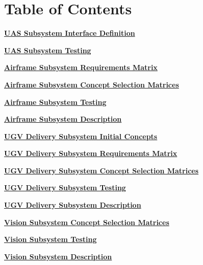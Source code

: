 \documentclass[]{article}
\newcounter{includepdfpage}
\newcommand{\pdflink}[2]{
\hyperlink{#1.1}{\textbf{#2}}
}
\newcommand{\pdflinkdoc}[2]{

}
\begin{document}



\section*{Table of Contents}

\pdflink{ss_def}{UAS Subsystem Interface Definition}

\pdflink{ss_test}{UAS Subsystem Testing}


\pdflink{af_reqmat}{Airframe Subsystem Requirements Matrix}

\pdflink{af_select}{Airframe Subsystem Concept Selection Matrices}

\pdflink{af_test}{Airframe Subsystem Testing}

\pdflink{af_def}{Airframe Subsystem Description}


\pdflink{ugv_init}{UGV Delivery Subsystem Initial Concepts}

\pdflink{ugv_reqmat}{UGV Delivery Subsystem Requirements Matrix}

\pdflink{ugv_select}{UGV Delivery Subsystem Concept Selection Matrices}

\pdflink{ugv_test}{UGV Delivery Subsystem Testing}

\pdflink{ugv_def}{UGV Delivery Subsystem Description}


\pdflink{vis_select}{Vision Subsystem Concept Selection Matrices}

\pdflink{vis_test}{Vision Subsystem Testing}

\pdflink{vis_def}{Vision Subsystem Description}


\pdflinkdoc{ss_def}{./SubsystemInterfaces/SubsystemInterfacesDescription/SubsystemInterfaceDefinitions.pdf}
\pdflinkdoc{ss_test}{./SubsystemInterfaces/SITestProceduresAndResults/SITestProceduresAndResults.pdf}

\pdflinkdoc{af_reqmat}{./Airframe/AirframeRequirementsMatrix/AirframeRequirementsMatrix.pdf}
\pdflinkdoc{af_select}{./Airframe/AirframeConceptSelectionMatrices/AirframeConceptSelectionMatrices.pdf}
\pdflinkdoc{af_test}{./Airframe/AirframeConceptTestProceduresAndResults/AirframeConceptTestProceduresAndResults.pdf}
\pdflinkdoc{af_def}{./Airframe/AirframeDescription/AirframeDescription.pdf}

\pdflinkdoc{ugv_init}{./UGV/UGVInitialConcepts/InitialConceptGeneration.pdf}
\pdflinkdoc{ugv_reqmat}{./UGV/UGVRequirmentsMatrix/main.pdf}
\pdflinkdoc{ugv_select}{./UGV/UGVConceptSelectionMatrices/UGVConceptSelectionMatrices.pdf}
\pdflinkdoc{ugv_test}{./UGV/UGVConceptTestProceduresAndResults/UGVConceptTestProceduresAndResults.pdf}
\pdflinkdoc{ugv_def}{./UGV/UGVDescription/UGVConceptDescription.pdf}

\pdflinkdoc{vis_select}{./VisionConceptDescription/VisionConceptSelectionMatrices/VisionConceptSelectionMatrices.pdf}
\pdflinkdoc{vis_test}{./VisionConceptDescription/VisionConceptTestProceduresAndResults/VisionTestProceduresAndResults.pdf}
\pdflinkdoc{vis_def}{./VisionConceptDescription/VisionDescription/VisionConceptDescription.pdf}
\end{document}
